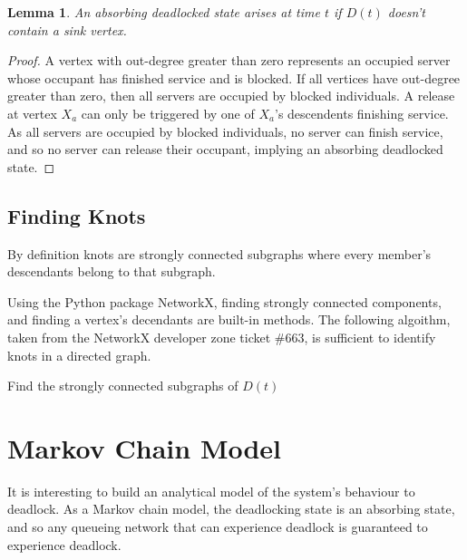 \documentclass{article}
\newtheorem{lemma}{Lemma}
\begin{document}
\begin{lemma}
An absorbing deadlocked state arises at time $t$ if $D(t)$ doesn't contain a sink vertex.
\end{lemma}

\begin{proof}
A vertex with out-degree greater than zero represents an occupied server whose occupant has finished service and is blocked.
If all vertices have out-degree greater than zero, then all servers are occupied by blocked individuals.
A release at vertex $X_a$ can only be triggered by one of $X_a$'s descendents finishing service.
As all servers are occupied by blocked individuals, no server can finish service, and so no server can release their occupant, implying an absorbing deadlocked state.
\end{proof}

\subsection{Finding Knots}

By definition knots are strongly connected subgraphs where every member's descendants belong to that subgraph.

Using the Python package NetworkX, finding strongly connected components, and finding a vertex's decendants are built-in methods.
The following algoithm, taken from the NetworkX developer zone ticket \#663, is sufficient to identify knots in a directed graph.

\begin{algorithm}[H]
    \DontPrintSemicolon
    Find the strongly connected subgraphs of $D(t)$\;
    \;
\end{algorithm}



\section{Markov Chain Model}

It is interesting to build an analytical model of the system's behaviour to deadlock.
As a Markov chain model, the deadlocking state is an absorbing state, and so any queueing network that can experience deadlock is guaranteed to experience deadlock.
\end{document}
